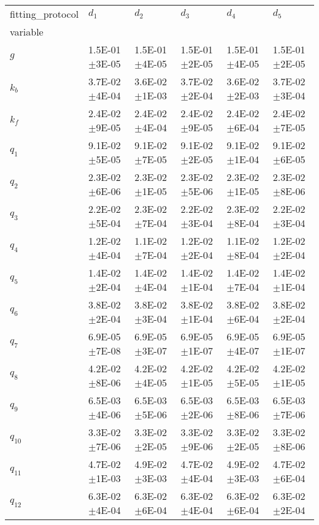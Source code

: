 \begin{tabular}{llllll}
fitting_protocol & $d_1$ & $d_2$ & $d_3$ & $d_4$ & $d_5$ \\
variable &  &  &  &  &  \\
$g$ & 1.5E-01\(\pm\)3E-05 & 1.5E-01\(\pm\)4E-05 & 1.5E-01\(\pm\)2E-05 & 1.5E-01\(\pm\)4E-05 & 1.5E-01\(\pm\)2E-05 \\
$k_b$ & 3.7E-02\(\pm\)4E-04 & 3.6E-02\(\pm\)1E-03 & 3.7E-02\(\pm\)2E-04 & 3.6E-02\(\pm\)2E-03 & 3.7E-02\(\pm\)3E-04 \\
$k_f$ & 2.4E-02\(\pm\)9E-05 & 2.4E-02\(\pm\)4E-04 & 2.4E-02\(\pm\)9E-05 & 2.4E-02\(\pm\)6E-04 & 2.4E-02\(\pm\)7E-05 \\
$q_1$ & 9.1E-02\(\pm\)5E-05 & 9.1E-02\(\pm\)7E-05 & 9.1E-02\(\pm\)2E-05 & 9.1E-02\(\pm\)1E-04 & 9.1E-02\(\pm\)6E-05 \\
$q_2$ & 2.3E-02\(\pm\)6E-06 & 2.3E-02\(\pm\)1E-05 & 2.3E-02\(\pm\)5E-06 & 2.3E-02\(\pm\)1E-05 & 2.3E-02\(\pm\)8E-06 \\
$q_3$ & 2.2E-02\(\pm\)5E-04 & 2.3E-02\(\pm\)7E-04 & 2.2E-02\(\pm\)3E-04 & 2.3E-02\(\pm\)8E-04 & 2.2E-02\(\pm\)3E-04 \\
$q_4$ & 1.2E-02\(\pm\)4E-04 & 1.1E-02\(\pm\)7E-04 & 1.2E-02\(\pm\)2E-04 & 1.1E-02\(\pm\)8E-04 & 1.2E-02\(\pm\)2E-04 \\
$q_5$ & 1.4E-02\(\pm\)2E-04 & 1.4E-02\(\pm\)4E-04 & 1.4E-02\(\pm\)1E-04 & 1.4E-02\(\pm\)7E-04 & 1.4E-02\(\pm\)1E-04 \\
$q_6$ & 3.8E-02\(\pm\)2E-04 & 3.8E-02\(\pm\)3E-04 & 3.8E-02\(\pm\)1E-04 & 3.8E-02\(\pm\)6E-04 & 3.8E-02\(\pm\)2E-04 \\
$q_7$ & 6.9E-05\(\pm\)7E-08 & 6.9E-05\(\pm\)3E-07 & 6.9E-05\(\pm\)1E-07 & 6.9E-05\(\pm\)4E-07 & 6.9E-05\(\pm\)1E-07 \\
$q_8$ & 4.2E-02\(\pm\)8E-06 & 4.2E-02\(\pm\)4E-05 & 4.2E-02\(\pm\)1E-05 & 4.2E-02\(\pm\)5E-05 & 4.2E-02\(\pm\)1E-05 \\
$q_9$ & 6.5E-03\(\pm\)4E-06 & 6.5E-03\(\pm\)5E-06 & 6.5E-03\(\pm\)2E-06 & 6.5E-03\(\pm\)8E-06 & 6.5E-03\(\pm\)7E-06 \\
$q_{10}$ & 3.3E-02\(\pm\)7E-06 & 3.3E-02\(\pm\)2E-05 & 3.3E-02\(\pm\)9E-06 & 3.3E-02\(\pm\)2E-05 & 3.3E-02\(\pm\)8E-06 \\
$q_{11}$ & 4.7E-02\(\pm\)1E-03 & 4.9E-02\(\pm\)3E-03 & 4.7E-02\(\pm\)4E-04 & 4.9E-02\(\pm\)3E-03 & 4.7E-02\(\pm\)6E-04 \\
$q_{12}$ & 6.3E-02\(\pm\)4E-04 & 6.3E-02\(\pm\)6E-04 & 6.3E-02\(\pm\)4E-04 & 6.3E-02\(\pm\)6E-04 & 6.3E-02\(\pm\)2E-04 \\
\end{tabular}
